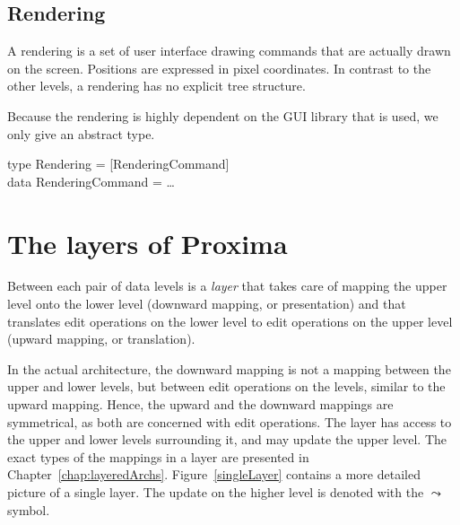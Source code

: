 \subsection{Rendering}

A rendering is a set of user interface drawing commands that are actually drawn on the screen. Positions are expressed in pixel coordinates. In contrast to the other levels, a rendering has no explicit tree structure. 

Because the rendering is highly dependent on the GUI library that is used, we only give an abstract type.

\noindent
\ttfamily
\begin{tabbing}
type Rendering = [RenderingCommand]\\
data RenderingCommand = \dots
\end{tabbing}
\rmfamily

\section{The layers of Proxima}

Between each pair of data levels is a {\em layer} that takes care of mapping the upper level onto the lower level (downward mapping, or presentation) and that translates edit operations on the lower level to edit operations on the upper level (upward mapping, or translation). 

In the actual architecture, the downward mapping is not a mapping between the upper and lower levels, but between edit operations on the levels, similar to the upward mapping. Hence, the upward and the downward mappings are symmetrical, as both are concerned with edit operations. The layer has access to the upper and lower levels surrounding it, and may update the upper level.  The exact types of the mappings in a layer are presented in Chapter~\ref{chap:layeredArchs}. Figure~\ref{singleLayer} contains a more detailed picture of a single layer. The update on the higher level is denoted with the $\leadsto$ symbol.


